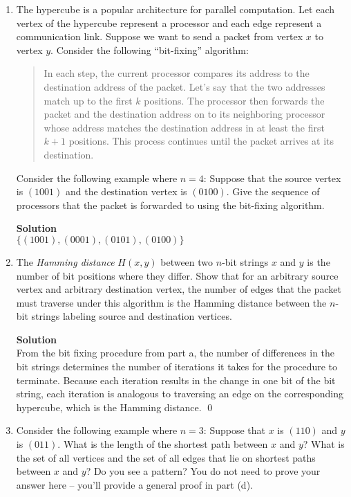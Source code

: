 \documentclass[11pt]{article}
\newenvironment{Parts}{\begin{enumerate}[label=(\alph*)]}{\end{enumerate}}
\newcommand*{\Part}{\item}
\begin{document}
\begin{Parts}
  \Part The hypercube is a popular architecture for parallel computation. Let
  each vertex of the hypercube represent a processor and each edge represent a
  communication link. Suppose we want to send a packet from vertex $x$ to vertex
  $y$. Consider the following ``bit-fixing'' algorithm:
  \begin{quote} In each step, the current processor compares its address to the
    destination address of the packet. Let's say that the two addresses match up
    to the first $k$ positions. The processor then forwards the packet and the
    destination address on to its neighboring processor whose address matches
    the destination address in at least the first $k+1$ positions. This process
    continues until the packet arrives at its destination.
 \end{quote}
 Consider the following example where $n=4$: Suppose that the source vertex is
 $(1001)$ and the destination vertex is $(0100)$. Give the sequence of
 processors that the packet is forwarded to using the bit-fixing algorithm.

\begin{mdframed} \textbf{Solution} \\
$\{(1001),(0001),(0101),(0100)\}$
\end{mdframed}

\pagebreak   

 \Part The \emph{Hamming distance} $H(x, y)$ between two $n$-bit strings $x$ and
 $y$ is the number of bit positions where they differ. Show that for an
 arbitrary source vertex and arbitrary destination vertex, the number of edges
 that the packet must traverse under this algorithm is the Hamming distance
 between the $n$-bit strings labeling source and destination vertices.

\begin{mdframed} \textbf{Solution} \\
From the bit fixing procedure from part a, the number of differences in the bit strings determines the number of iterations it takes for the procedure to terminate. Because each iteration results in the change in one bit of the bit string, each iteration is analogous to traversing an edge on the corresponding hypercube, which is the Hamming distance. \qed
\end{mdframed}

 \Part Consider the following example where $n=3$: Suppose that $x$ is $(110)$
 and $y$ is $(011)$. What is the length of the shortest path between $x$ and
 $y$?  What is the set of all vertices and the set of all edges that lie on
 shortest paths between $x$ and $y$? Do you see a pattern?  You do not need to
 prove your answer here -- you'll provide a general proof in part (d).


\end{Parts}
\end{document}
